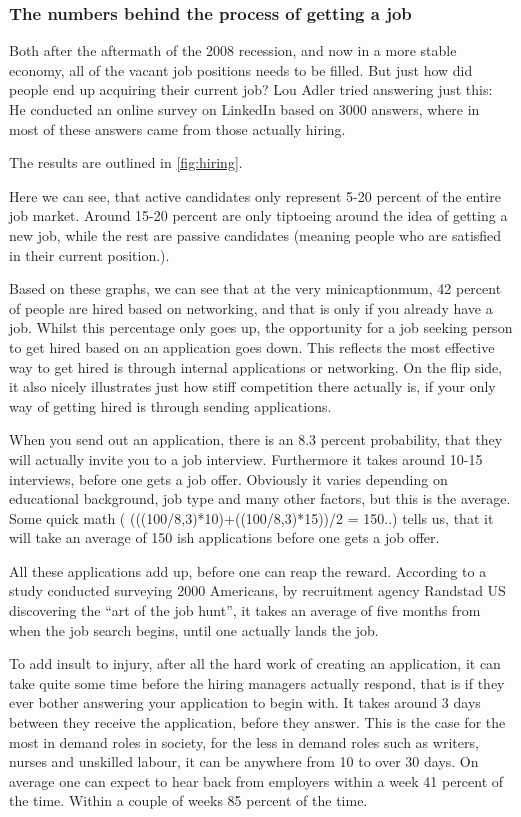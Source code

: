 \subsubsection{The numbers behind the process of getting a job}
Both after the aftermath of the 2008 recession, and now in a more stable
economy, all of the vacant job positions needs to be
filled. But just how did people end up acquiring their current job?
Lou Adler tried answering just this: He conducted an online survey
on LinkedIn based on 3000 answers, where in most of these answers
came from those actually hiring.

The results are outlined in \vref{fig:hiring}.

Here we can see, that active candidates only represent 5-20 percent of the
entire job market. Around 15-20 percent are only tiptoeing around the idea
of getting a new job, while the rest are passive candidates (meaning people who are
satisfied in their current position.).

Based on these graphs, we can see that at the very minicaptionmum, 42 percent of people are
hired based on networking, and that is only if you already have a job.
Whilst this percentage only goes up, the opportunity for a job seeking person
to get hired based on an application goes down. This reflects the
most effective way to get hired is through internal applications or networking.
On the flip side, it also nicely illustrates just how stiff competition there actually is,
if your only way of getting hired is through sending applications.

When you send out an application, there is an 8.3 percent probability, that
they will actually invite you to a job interview. Furthermore it takes around
10-15 interviews, before one gets a job offer. Obviously it varies depending
on educational background, job type and many other factors, but this is the average.
Some quick math ( (((100/8,3)*10)+((100/8,3)*15))/2 = 150..) tells us, that it will
take an average of 150 ish applications before one gets a job offer.\cite{HR-sales}

All these applications add up, before one can reap the reward. According to a
study conducted surveying 2000 Americans, by recruitment agency Randstad US
discovering the “art of the job hunt”, it takes an average of five
months from when the job search begins, until one actually lands
the job. \cite{5_month_for_a_job}

To add insult to injury, after all the hard work of creating an application, it can
take quite some time before the hiring managers actually respond, that is if they ever
bother answering your application to begin with.
It takes around 3 days between they receive the application, before they answer.
This is the case for the most in demand roles in society, for the less in demand roles
such as writers, nurses and unskilled labour, it can be anywhere from 10 to over 30 days.\cite{HR-sales}
On average one can expect to hear back from employers within a week 41 percent
of the time. Within a couple of weeks 85 percent of the time.\cite{Hear_back_your_job}

